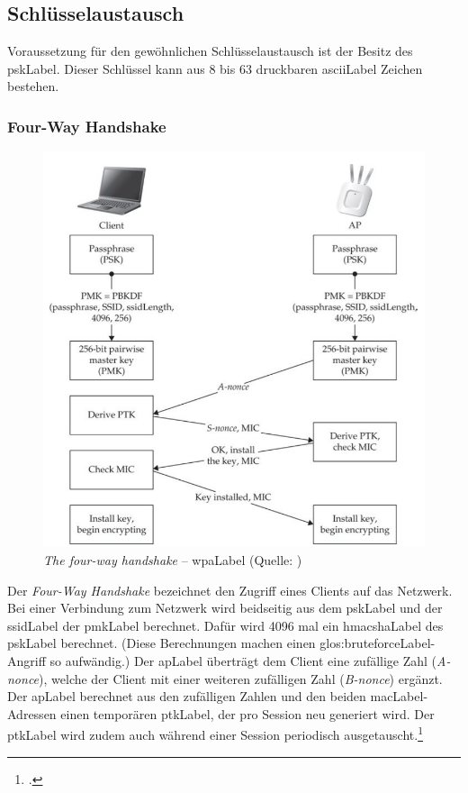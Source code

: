\subsection{Schlüsselaustausch}
Voraussetzung für den gewöhnlichen Schlüsselaustausch ist der Besitz des \gls{pskLabel}.
Dieser Schlüssel kann aus 8 bis 63 druckbaren \gls{asciiLabel} Zeichen bestehen.

\subsubsection{Four-Way Handshake}
\begin{figure}[H]
	\centering
	\includegraphics[width=0.8\linewidth]{images/wpa/four-way-handshake.png}
	\caption[The four-way handshake -- WPA]{\textit{The four-way handshake} -- \gls{wpaLabel} (Quelle: \cite[][151]{WrightCache201503})}
\end{figure}
Der \textit{Four-Way Handshake} bezeichnet den Zugriff eines Clients auf das Netzwerk.
Bei einer Verbindung zum Netzwerk wird beidseitig aus dem \gls{pskLabel} und der \gls{ssidLabel} der \gls{pmkLabel} berechnet.
Dafür wird 4096 mal ein \gls{hmacshaLabel} des \gls{pskLabel} berechnet. (Diese Berechnungen machen einen \gls{glos:bruteforceLabel}-Angriff so aufwändig.)
Der \gls{apLabel} überträgt dem Client eine zufällige Zahl (\textit{A-nonce}), welche der Client mit einer weiteren zufälligen Zahl (\textit{B-nonce}) ergänzt.
Der \gls{apLabel} berechnet aus den zufälligen Zahlen und den beiden \gls{macLabel}-Adressen einen temporären \gls{ptkLabel}, der pro Session neu generiert wird. Der \gls{ptkLabel} wird zudem auch während einer Session periodisch ausgetauscht.\footcite[][40ff.]{WrightCache201503}

